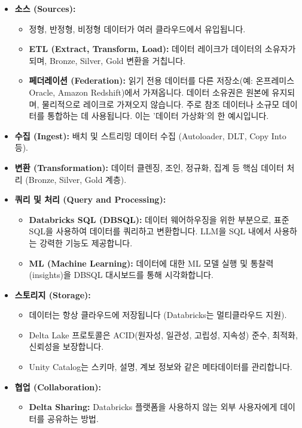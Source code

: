 \documentclass[11pt,a4paper]{article}
\begin{document}
\begin{itemize}
    \item \textbf{소스 (Sources):}
    \begin{itemize}
        \item 정형, 반정형, 비정형 데이터가 여러 클라우드에서 유입됩니다.
        \item \textbf{ETL (Extract, Transform, Load):} 데이터 레이크가 데이터의 소유자가 되며, Bronze, Silver, Gold 변환을 거칩니다.
        \item \textbf{페더레이션 (Federation):} 읽기 전용 데이터를 다른 저장소(예: 온프레미스 Oracle, Amazon Redshift)에서 가져옵니다. 데이터 소유권은 원본에 유지되며, 물리적으로 레이크로 가져오지 않습니다. 주로 참조 데이터나 소규모 데이터를 통합하는 데 사용됩니다. 이는 '데이터 가상화'의 한 예시입니다.
    \end{itemize}
    \item \textbf{수집 (Ingest):} 배치 및 스트리밍 데이터 수집 (Autoloader, DLT, Copy Into 등).
    \item \textbf{변환 (Transformation):} 데이터 클렌징, 조인, 정규화, 집계 등 핵심 데이터 처리 (Bronze, Silver, Gold 계층).
    \item \textbf{쿼리 및 처리 (Query and Processing):}
    \begin{itemize}
        \item \textbf{Databricks SQL (DBSQL):} 데이터 웨어하우징을 위한 부분으로, 표준 SQL을 사용하여 데이터를 쿼리하고 변환합니다. LLM을 SQL 내에서 사용하는 강력한 기능도 제공합니다.
        \item \textbf{ML (Machine Learning):} 데이터에 대한 ML 모델 실행 및 통찰력(insights)을 DBSQL 대시보드를 통해 시각화합니다.
    \end{itemize}
    \item \textbf{스토리지 (Storage):}
    \begin{itemize}
        \item 데이터는 항상 클라우드에 저장됩니다 (Databricks는 멀티클라우드 지원).
        \item Delta Lake 프로토콜은 ACID(원자성, 일관성, 고립성, 지속성) 준수, 최적화, 신뢰성을 보장합니다.
        \item Unity Catalog는 스키마, 설명, 계보 정보와 같은 메타데이터를 관리합니다.
    \end{itemize}
    \item \textbf{협업 (Collaboration):}
    \begin{itemize}
        \item \textbf{Delta Sharing:} Databricks 플랫폼을 사용하지 않는 외부 사용자에게 데이터를 공유하는 방법.

\end{itemize}
\end{itemize}
\end{document}
